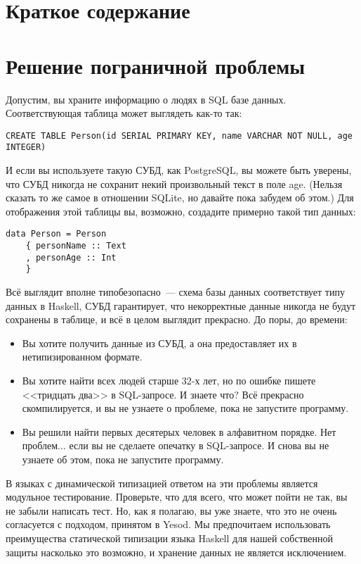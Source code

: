 \section{Краткое содержание}


\section{Решение пограничной проблемы}

Допустим, вы храните информацию о людях в SQL базе данных. Соответствующая
таблица может выглядеть как-то так:
\begin{lstlisting}
CREATE TABLE Person(id SERIAL PRIMARY KEY, name VARCHAR NOT NULL, age INTEGER)
\end{lstlisting}

И если вы используете такую СУБД, как PostgreSQL, вы можете быть уверены, что
СУБД никогда не сохранит некий произвольный текст в поле age. (Нельзя сказать
то же самое в отношении SQLite, но давайте пока забудем об этом.) Для
отображения этой таблицы вы, возможно, создадите примерно такой тип данных:
\begin{lstlisting}
data Person = Person
    { personName :: Text
    , personAge :: Int
    }
\end{lstlisting}

Всё выглядит вполне типобезопасно~--- схема базы данных соответствует типу
данных в Haskell, СУБД гарантирует, что некорректные данные никогда не будут
сохранены в таблице, и всё в целом выглядит прекрасно. До поры, до времени:
\begin{itemize}
  \item Вы хотите получить данные из СУБД, а она предоставляет их в
      нетипизированном формате.

  \item Вы хотите найти всех людей старше 32-х лет, но по ошибке пишете
      <<тридцать два>> в SQL-запросе. И знаете что? Всё прекрасно
      скомпилируется, и вы не узнаете о проблеме, пока не запустите программу.

  \item Вы решили найти первых десятерых человек в алфавитном порядке. Нет
      проблем... если вы не сделаете опечатку в SQL-запросе. И снова вы не
      узнаете об этом, пока не запустите программу.
\end{itemize}

В языках с динамической типизацией ответом на эти проблемы является модульное
тестирование. Проверьте, что для всего, что может пойти не так, вы не забыли
написать тест. Но, как я полагаю, вы уже знаете, что это не очень согласуется с
подходом, принятом в Yesod. Мы предпочитаем использовать преимущества
статической типизации языка Haskell для нашей собственной защиты насколько это
возможно, и хранение данных не является исключением.


